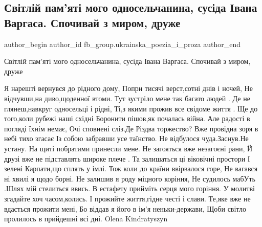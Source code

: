  
 
 
 
 

\subsection{Світлій пам'яті мого односельчанина, сусіда Івана Варгаса. Спочивай з миром, друже}
\label{sec:10_01_2023.fb.fb_group.ukrainska_poezia_i_proza.1.sv_tl_i_pam_yat__mog}

\ifcmt
 author_begin
   author_id fb_group.ukrainska_poezia_i_proza
 author_end
\fi

Світлій пам'яті мого односельчанина, сусіда Івана Варгаса. Спочивай з миром, друже

\obeycr
Я нарешті вернувся до рідного дому, 
Попри тисячі верст,сотні днів і ночей,
Не відчувши,на диво,щоденної втоми.
Тут зустріло мене так багато людей .
Де не глянеш,навкруг односельці і рідні,
Ті,з якими прожив все свідоме життя .
Ще до того,коли рубежі наші східні 
Боронити пішов,як почалась війна.
Але радості в погляді їхнім немає, 
Очі сповнені сліз.Де Різдва торжество?
Вже провідна зоря в небі тихо згасає
Із собою забравши усе таїнство.
Не відбулося чуда.Заснув.Не устану.
На щиті побратими принесли мене.
Не загояться вже незагоєні рани,
Й друзі вже не підставлять широке плече .
Та залишаться ці віковічні простори
І зелені Карпати,що сплять у імлі.
Тож коли до країни ввірвалося горе,
Не вагався ні хвилі я щодо борні.
Не залишив я роду міцного коріння,
Не судилось мабУть .Шлях мій стелиться ввись.
В естафету прийміть серця мого горіння.
У молитві згадайте хоч часом,колись.
І прожийте життя,гідне честі і слави.
Те,яке вже не вдасться прожити мені,
Бо віддав я його в ім'я неньки-держави,
Щоби світло пролилось в прийдешні всі дні.
Olena Kindratyszyn
\restorecr
